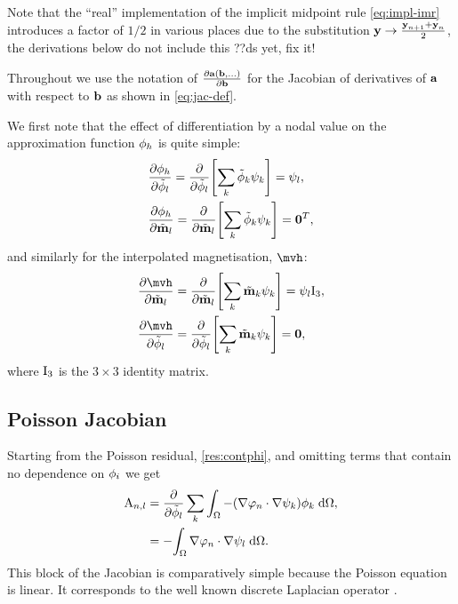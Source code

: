 Note that the ``real'' implementation of the implicit midpoint rule \cref{eq:impl-imr} introduces a factor of $1/2$ in various places due to the substitution $ \boldsymbol{\mathrm{y}} \rightarrow \frac{\boldsymbol{\mathrm{y}}_{n+1} + \boldsymbol{\mathrm{y}}_n}{2}$, the derivations below do not include this ??ds yet, fix it!

Throughout  we use the notation of $\frac{\partial {\boldsymbol{\mathrm{a}}}({\boldsymbol{\mathrm{b}}}, \ldots)}{\partial {\boldsymbol{\mathrm{b}}}}$ for the Jacobian of derivatives of ${\boldsymbol{\mathrm{a}}}$ with respect to ${\boldsymbol{\mathrm{b}}}$ as shown in \cref{eq:jac-def}.

We first note that the effect of differentiation by a nodal value on the approximation function ${\phi}_h$ is quite simple:
\begin{equation}
  \begin{aligned}
    &\frac{\partial {\phi}_h}{\partial \tilde{\phi}_l} = \frac{\partial }{\partial \tilde{\phi}_l} {\left[  \sum_k \tilde{\phi}_k {\psi_k}  \right]} = \psi_l, \\
    &\frac{\partial {\phi}_h}{\partial \tilde{\boldsymbol{\mathrm{m}}}_l} = \frac{\partial }{\partial \tilde{\boldsymbol{\mathrm{m}}}_l} {\left[  \sum_k \tilde{\phi}_k {\psi_k}  \right]} = \mathbf{0}^T, \\
  \end{aligned}
\end{equation}
and similarly for the interpolated magnetisation, $\mvh$:
\begin{equation}
  \begin{aligned}
    &\pd{\mvh}{\mvdis_l} = \pd{}{\mvdis_l} \bigs{ \sum_k \mvdis_k \sk } = \sbf_l \Idm_3, \\
    &\pd{\mvh}{\phimdis_l} = \pd{}{\phimdis_l} \bigs{ \sum_k \mvdis_k \sk } = \zerov, \\
\end{aligned}
\end{equation}
where $\mathrm{I}_3$ is the $3\times3$ identity matrix.

\subsection{Poisson Jacobian}
\label{sec:poisson-jacobian}

Starting from the Poisson residual, \cref{res:contphi}, and omitting terms that contain no dependence on $\phi_i$ we get
\begin{equation}
  \begin{aligned}
    \label{eq:poisson-jacobian}
    \mathrm{A}_{n,l} &= \frac{\partial }{\partial \tilde{\phi}_l} \sum_k {\int_{\Omega} { -(\nabla \varphi_n \cdot \nabla \psi_k) \phi_{k}} {\; \mathrm{{d}}} {\Omega}}, \\
    &= -{\int_{\Omega} {\nabla \varphi_n \cdot \nabla \psi_l} {\; \mathrm{{d}}} {\Omega}}.
  \end{aligned}
\end{equation}
This block of the Jacobian is comparatively simple because the Poisson equation is linear.
It corresponds to the well known discrete Laplacian operator \cite[57]{HowardElmanDavidSilvester2006}.


